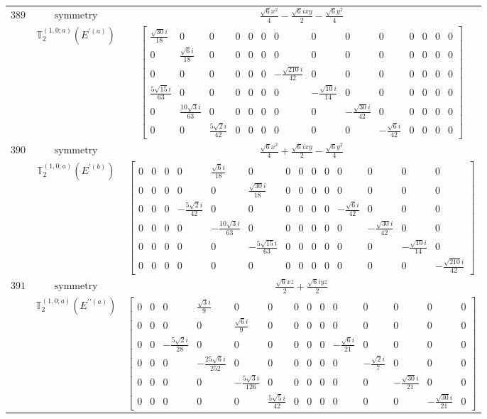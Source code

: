 \documentclass[fleqn,8pt,landscape]{jsarticle}
\begin{document}
\begin{longtable}{ccc}
$ 389 $ & $ \text{symmetry} $ & $ \frac{\sqrt{6} x^{2}}{4} - \frac{\sqrt{6} i x y}{2} - \frac{\sqrt{6} y^{2}}{4} $ \\
$  $ & $ \mathbb{T}_{2}^{(1,0;a)}(E^{\prime(a)}) $ & $ \begin{bmatrix} \frac{\sqrt{30} i}{18} & 0 & 0 & 0 & 0 & 0 & 0 & 0 & 0 & 0 & 0 & 0 & 0 & 0 \\ 0 & \frac{\sqrt{6} i}{18} & 0 & 0 & 0 & 0 & 0 & 0 & 0 & 0 & 0 & 0 & 0 & 0 \\ 0 & 0 & 0 & 0 & 0 & 0 & - \frac{\sqrt{210} i}{42} & 0 & 0 & 0 & 0 & 0 & 0 & 0 \\ \frac{5 \sqrt{15} i}{63} & 0 & 0 & 0 & 0 & 0 & 0 & - \frac{\sqrt{10} i}{14} & 0 & 0 & 0 & 0 & 0 & 0 \\ 0 & \frac{10 \sqrt{3} i}{63} & 0 & 0 & 0 & 0 & 0 & 0 & - \frac{\sqrt{30} i}{42} & 0 & 0 & 0 & 0 & 0 \\ 0 & 0 & \frac{5 \sqrt{2} i}{42} & 0 & 0 & 0 & 0 & 0 & 0 & - \frac{\sqrt{6} i}{42} & 0 & 0 & 0 & 0 \end{bmatrix} $ \\ \hline
$ 390 $ & $ \text{symmetry} $ & $ \frac{\sqrt{6} x^{2}}{4} + \frac{\sqrt{6} i x y}{2} - \frac{\sqrt{6} y^{2}}{4} $ \\
$  $ & $ \mathbb{T}_{2}^{(1,0;a)}(E^{\prime(b)}) $ & $ \begin{bmatrix} 0 & 0 & 0 & 0 & \frac{\sqrt{6} i}{18} & 0 & 0 & 0 & 0 & 0 & 0 & 0 & 0 & 0 \\ 0 & 0 & 0 & 0 & 0 & \frac{\sqrt{30} i}{18} & 0 & 0 & 0 & 0 & 0 & 0 & 0 & 0 \\ 0 & 0 & 0 & - \frac{5 \sqrt{2} i}{42} & 0 & 0 & 0 & 0 & 0 & 0 & - \frac{\sqrt{6} i}{42} & 0 & 0 & 0 \\ 0 & 0 & 0 & 0 & - \frac{10 \sqrt{3} i}{63} & 0 & 0 & 0 & 0 & 0 & 0 & - \frac{\sqrt{30} i}{42} & 0 & 0 \\ 0 & 0 & 0 & 0 & 0 & - \frac{5 \sqrt{15} i}{63} & 0 & 0 & 0 & 0 & 0 & 0 & - \frac{\sqrt{10} i}{14} & 0 \\ 0 & 0 & 0 & 0 & 0 & 0 & 0 & 0 & 0 & 0 & 0 & 0 & 0 & - \frac{\sqrt{210} i}{42} \end{bmatrix} $ \\ \hline
$ 391 $ & $ \text{symmetry} $ & $ \frac{\sqrt{6} x z}{2} + \frac{\sqrt{6} i y z}{2} $ \\
$  $ & $ \mathbb{T}_{2}^{(1,0;a)}(E^{\prime\prime(a)}) $ & $ \begin{bmatrix} 0 & 0 & 0 & \frac{\sqrt{3} i}{9} & 0 & 0 & 0 & 0 & 0 & 0 & 0 & 0 & 0 & 0 \\ 0 & 0 & 0 & 0 & \frac{\sqrt{6} i}{9} & 0 & 0 & 0 & 0 & 0 & 0 & 0 & 0 & 0 \\ 0 & 0 & - \frac{5 \sqrt{2} i}{28} & 0 & 0 & 0 & 0 & 0 & 0 & - \frac{\sqrt{6} i}{21} & 0 & 0 & 0 & 0 \\ 0 & 0 & 0 & - \frac{25 \sqrt{6} i}{252} & 0 & 0 & 0 & 0 & 0 & 0 & - \frac{\sqrt{2} i}{7} & 0 & 0 & 0 \\ 0 & 0 & 0 & 0 & - \frac{5 \sqrt{3} i}{126} & 0 & 0 & 0 & 0 & 0 & 0 & - \frac{\sqrt{30} i}{21} & 0 & 0 \\ 0 & 0 & 0 & 0 & 0 & \frac{5 \sqrt{5} i}{42} & 0 & 0 & 0 & 0 & 0 & 0 & - \frac{\sqrt{30} i}{21} & 0 \end{bmatrix} $ \\ \hline

\end{longtable}
\end{document}
